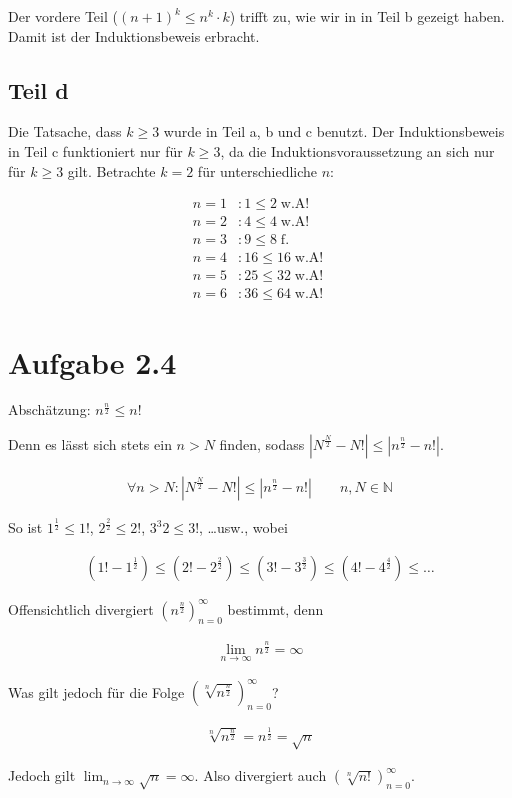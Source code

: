 \documentclass[a4paper,german,12pt,smallheadings]{scrartcl}
\begin{document}
Der vordere Teil ($(n+1)^k \le n^k \cdot k$) trifft zu, wie wir in in Teil b gezeigt haben. Damit ist der Induktionsbeweis erbracht.
\subsection*{Teil d}

Die Tatsache, dass $k \ge 3$ wurde in Teil a, b und c benutzt. Der Induktionsbeweis in Teil c funktioniert nur für $k \ge 3$, da die Induktionsvoraussetzung an sich nur für $k \ge 3$ gilt. Betrachte $k=2$ für unterschiedliche $n$:

\begin{align*}
  n=1&: 1 \le 2 \operatorname{w.A!}\\
  n=2&: 4 \le 4 \operatorname{w.A!}\\
  n=3&: 9 \le 8 \operatorname{f.}\\
  n=4&: 16 \le 16 \operatorname{w.A!}\\
  n=5&: 25 \le 32 \operatorname{w.A!}\\
  n=6&: 36 \le 64 \operatorname{w.A!}
\end{align*}

\section*{Aufgabe 2.4}
Abschätzung: $n^\frac{n}{2} \le n!$

Denn es lässt sich stets ein $n > N$ finden, sodass $|N^{\frac{N}{2}} - N!| \le
|n^\frac{n}{2} - n!|$.

\begin{align*}
  \forall n > N: |N^\frac{N}{2} - N!| \le |n^\frac{n}{2} - n!| \qquad n,N \in \mathbb{N}
\end{align*}

So ist $1^\frac{1}{2} \le 1!$, $2^{\frac{2}{2}} \le 2!$, $3^{3}{2} \le 3!$, \dots usw., wobei

\begin{align*}
  (1! - 1^{\frac{1}{2}}) \le (2! - 2^{\frac{2}{2}}) \le (3! - 3^{\frac{3}{2}}) \le (4! - 4^{\frac{4}{2}}) \le \dots
\end{align*}

Offensichtlich divergiert $\left(n^\frac{n}{2}\right)_{n=0}^{\infty}$ bestimmt, denn

\begin{align*}
  \lim_{n \to \infty} n^\frac{n}{2} = \infty
\end{align*}

Was gilt jedoch für die Folge $\left( \sqrt[n]{n^\frac{n}{2}} \right)_{n=0}^{\infty}$?

\begin{align*}
  \sqrt[n]{n^{\frac{n}{2}}} = n^\frac{1}{2} = \sqrt{n}
\end{align*}

Jedoch gilt $\lim_{n \to \infty} \sqrt{n} = \infty$. Also divergiert auch 
 $\left( \sqrt[n]{n!} \right)_{n=0}^{\infty}$.
\end{document}
